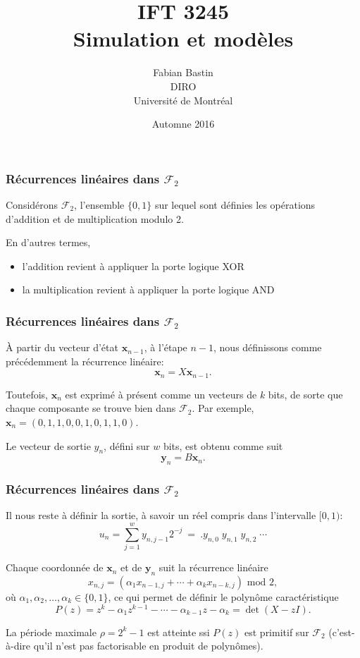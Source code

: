 \documentclass[t,usepdftitle=false]{beamer}
\title[IFT3245]{IFT 3245\\Simulation et modèles}
\author[Fabian Bastin]{Fabian Bastin\\DIRO\\Université de Montréal}
\date{Automne 2016}
\def\bx{\boldsymbol{x}}
\def\by{\boldsymbol{y}}
\begin{document}
\frame{\titlepage}

\begin{frame}
\frametitle{Récurrences linéaires dans $\mathcal{F}_2$}

Considérons $\mathcal{F}_2$, l'ensemble $\lbrace 0, 1 \rbrace$ sur
lequel sont définies les opérations d'addition et de multiplication
modulo 2.

\mbox{}

En d'autres termes, 
\begin{itemize}
\item
l'addition revient à appliquer la porte logique XOR
\item
la multiplication revient à appliquer la porte logique AND
\end{itemize}

\end{frame}

\begin{frame}
\frametitle{Récurrences linéaires dans $\mathcal{F}_2$}

\`A partir du vecteur d'état $\bx_{n-1}$, à l'étape $n-1$, nous
définissons comme précédemment la récurrence linéaire:
\[
 {\bx_n} = {X} \bx_{n-1}.
\]

\mbox{}

Toutefois, $\bx_n$ est exprimé à présent comme un vecteurs de $k$
bits, de sorte que chaque composante se trouve bien dans $\mathcal{F}_2$.
Par exemple, $\bx_n = (0,1,1,0,0,1,0,1,1,0).$

\mbox{}

Le vecteur de sortie $y_n$, défini sur $w$ bits, est obtenu comme suit
\[
 {\by_n} = {B} \bx_{n}.
\]

\end{frame}

\begin{frame}
\frametitle{Récurrences linéaires dans $\mathcal{F}_2$}

Il nous reste à définir la sortie, à savoir un réel compris dans
l'intervalle $[0, 1)$:
\[
 {u_n}  = \sum_{j=1}^w y_{n,j-1} 2^{-j}
       ~=~  .y_{n,0}\; y_{n,1}\; y_{n,2}\; \cdots
\]

\mbox{}

Chaque coordonnée de $\bx_n$ et de $\by_n$ suit la récurrence linéaire
$$
  x_{n,j} = (\alpha_1 x_{n-1,j} + \cdots + \alpha_k x_{n-k,j})\text{ mod }2,
$$
où $\alpha_1, \alpha_2,\ldots, \alpha_k \in \lbrace 0, 1 \rbrace$, ce qui permet de
définir le polynôme caractéristique
$$
  {P(z)} = z^k - \alpha_1 z^{k-1} - \cdots - \alpha_{k-1} z - \alpha_k
             = \det(X-zI).
$$

\mbox{}

La période maximale $\rho = 2^k-1$ est atteinte ssi 
$P(z)$ est primitif sur $\mathcal{F}_2$ (c'est-à-dire qu'il n'est pas
factorisable en produit de polynômes).

\end{frame}
\end{document}
